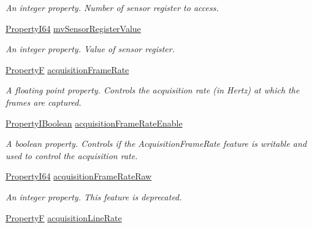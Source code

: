 \begin{DoxyCompactItemize}
\begin{DoxyCompactList}\small\item\em An integer property. Number of sensor register to access. \end{DoxyCompactList}\item 
\hyperlink{group___common_interface_ga81749b2696755513663492664a18a893}{Property\+I64} \hyperlink{classmv_i_m_p_a_c_t_1_1acquire_1_1_gen_i_cam_1_1_acquisition_control_a8ef065f9dd3a514f02f32b5c146919b4}{mv\+Sensor\+Register\+Value}
\begin{DoxyCompactList}\small\item\em An integer property. Value of sensor register. \end{DoxyCompactList}\item 
\hyperlink{group___common_interface_gaf54865fe5a3d5cfd15f9a111b40d09f9}{Property\+F} \hyperlink{classmv_i_m_p_a_c_t_1_1acquire_1_1_gen_i_cam_1_1_acquisition_control_a6439ee2ea1b4b18f4387922ad18aa9c2}{acquisition\+Frame\+Rate}
\begin{DoxyCompactList}\small\item\em A floating point property. Controls the acquisition rate (in Hertz) at which the frames are captured. \end{DoxyCompactList}\item 
\hyperlink{group___common_interface_ga44f9437e24b21b6c93da9039ec6786aa}{Property\+I\+Boolean} \hyperlink{classmv_i_m_p_a_c_t_1_1acquire_1_1_gen_i_cam_1_1_acquisition_control_a87e6ccd44f43111f4e1969175e04db0e}{acquisition\+Frame\+Rate\+Enable}
\begin{DoxyCompactList}\small\item\em A boolean property. Controls if the Acquisition\+Frame\+Rate feature is writable and used to control the acquisition rate. \end{DoxyCompactList}\item 
\hyperlink{group___common_interface_ga81749b2696755513663492664a18a893}{Property\+I64} \hyperlink{classmv_i_m_p_a_c_t_1_1acquire_1_1_gen_i_cam_1_1_acquisition_control_ae005cee593783684117beca6ec37c183}{acquisition\+Frame\+Rate\+Raw}
\begin{DoxyCompactList}\small\item\em An integer property. This feature is deprecated. \end{DoxyCompactList}\item 
\hyperlink{group___common_interface_gaf54865fe5a3d5cfd15f9a111b40d09f9}{Property\+F} \hyperlink{classmv_i_m_p_a_c_t_1_1acquire_1_1_gen_i_cam_1_1_acquisition_control_aebb38e835c99a65cb205cfe160b03ccd}{acquisition\+Line\+Rate}

\end{DoxyCompactItemize}
